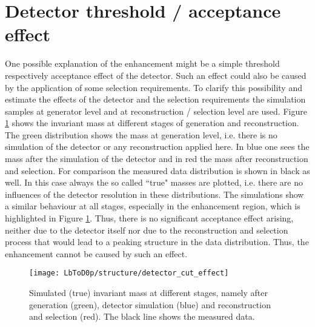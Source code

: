 \section{Detector threshold / acceptance effect}
One possible explanation of the enhancement might be a simple threshold respectively acceptance effect of the detector.
Such an effect could also be caused by the application of some selection requirements.
To clarify this possibility and estimate the effects of the detector and the selection requirements the simulation samples at generator level and at reconstruction / selection level are used.
Figure \ref{fig:detector_cut_effect} shows the invariant \Dz\proton mass at different stages of generation and reconstruction.
The green distribution shows the \Dz\proton mass at generation level, i.e. there is no simulation of the detector or any reconstruction applied here.
In blue one sees the \Dz\proton mass after the simulation of the detector and in red the mass after reconstruction and selection.
For comparison the measured data distribution is shown in black as well.
In this case always the so called ``true" masses are plotted, i.e. there are no influences of the detector resolution in these distributions.
The simulations show a similar behaviour at all stages, especially in the enhancement region, which is highlighted in Figure \ref{fig:detector_cut_effect}.
Thus, there is no significant acceptance effect arising, neither due to the detector itself nor due to the reconstruction and selection process that would lead to a peaking structure in the data distribution. 
Thus, the enhancement cannot be caused by such an effect.
\begin{figure}[tb]
	\centering
	\texttt{[image: LbToD0p/structure/detector\_cut\_effect]}
	\caption{Simulated (true) invariant \Dz\proton mass at different stages, namely after generation (green), detector simulation (blue) and reconstruction and selection (red). The black line shows the measured data.}
	\label{fig:detector_cut_effect}
\end{figure}

